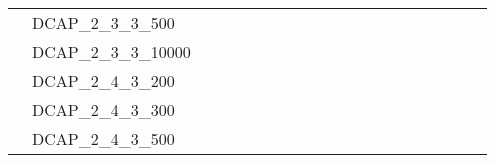 \begin{table}[]
{\begin{tabular}{|c|l|lll|lll|lllll|llll|lll|}
			& DCAP\_2\_3\_3\_500            &                          &                         &                          &                          &                         &                          &                          &                         &                         &                          &                           &                             &                             &                             &                               &                          &                          &                           \\
			& DCAP\_2\_3\_3\_10000          &                          &                         &                          &                          &                         &                          &                          &                         &                         &                          &                           &                             &                             &                             &                               &                          &                          &                           \\
			& DCAP\_2\_4\_3\_200            &                          &                         &                          &                          &                         &                          &                          &                         &                         &                          &                           &                             &                             &                             &                               &                          &                          &                           \\
			& DCAP\_2\_4\_3\_300            &                          &                         &                          &                          &                         &                          &                          &                         &                         &                          &                           &                             &                             &                             &                               &                          &                          &                           \\
			& DCAP\_2\_4\_3\_500            &                          &                         &                          &                          &                         &                          &                          &                         &                         &                          &                           &                             &                             &                             &                               &                          &                          &                           \\

\end{tabular}}
\end{table}
